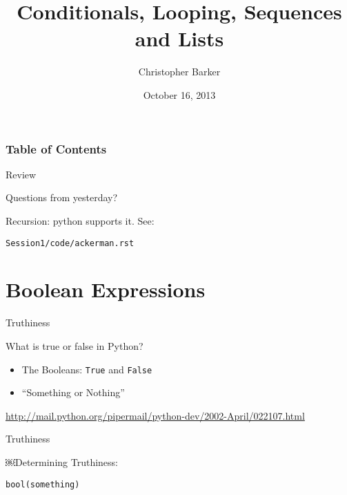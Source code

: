 \documentclass{beamer}
\title[IRIS Python Workshop Session 2a]{Conditionals, Looping, Sequences and Lists}
\author{Christopher Barker}
\institute{IRIS}
\date{October 16, 2013}
\begin{document}
\begin{frame}
\titlepage
\end{frame}

\begin{frame}
\frametitle{Table of Contents}
\tableofcontents
\end{frame}

\begin{frame}[fragile]{Review}

{\Large Questions from yesterday?}

\vfill
{\Large Recursion: python supports it. See:}

{\large \verb|Session1/code/ackerman.rst|}

\vfill
\end{frame}


\section{Boolean Expressions}

\begin{frame}[fragile]{Truthiness}

{\Large What is true or false in Python?}

\begin{itemize}
  \item The Booleans: \verb+True+ and \verb+False+
  \item ``Something or Nothing''
\end{itemize}

{\small \url{http://mail.python.org/pipermail/python-dev/2002-April/022107.html} }

\end{frame}

\begin{frame}[fragile]{Truthiness}

{\Large ￼Determining Truthiness:}

\vfill
{\Large \verb+bool(something)+ }

\vfill


\end{frame}
\end{document}
